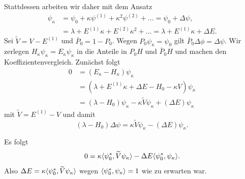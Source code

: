 \documentclass{mycourse}
\begin{document}
Stattdessen arbeiten wir daher mit dem Ansatz
\begin{align*}
\psi_\kappa&=\psi_0 + \kappa \psi^{(1)} + \kappa^2 \psi^{(2)} + ... = \psi_0 + \Delta\psi,\\
&= \lambda + E^{(1)} \kappa + E^{(2)} \kappa^2 +... = \lambda + E^{(1)} \kappa + \Delta E.
\end{align*}
Sei $\tilde V = V- E^{(1)}$ und $\bar P_0 = 1- P_0$. Wegen $P_0 \psi_\kappa = \psi_0$ gilt $\bar P_0\Delta \phi = \Delta \psi$. Wir zerlegen $H_\kappa \psi_\kappa = E_\kappa \psi_\kappa$ in die Anteile in $P_0 H$ und $\bar P_0 H$ und machen den Koeffizientenvergleich. Zunächst folgt
\begin{align*}
0 &= (E_\kappa - H_\kappa) \psi_\kappa \\
&=(\lambda + E^{(1)} \kappa + \Delta E - H_0 - \kappa V) \psi_\kappa \\
&= (\lambda-H_0) \psi_\kappa - \kappa \tilde V \psi_\kappa + (\Delta E) \psi_\kappa
\end{align*}
mit $\tilde V= E^{(1)} - V$ und damit
\begin{equation}\label{2.1}
(\lambda-H_0) \Delta \psi = \kappa \tilde V \psi_\kappa - (\Delta E) \psi_\kappa.
\end{equation}
\begin{seg}
Es folgt
\[
0=\kappa \langle \psi_0^*, \widetilde V \psi_\kappa\rangle - \Delta E\langle \psi_0^*, \psi_\kappa\rangle.
\]
Also $\Delta E= \kappa \langle \psi_0^*, \widetilde V \psi_\kappa\rangle$ wegen $\langle \psi_0^*, \psi_\kappa\rangle=1$ wie zu erwarten war.
\end{seg}
\end{document}
